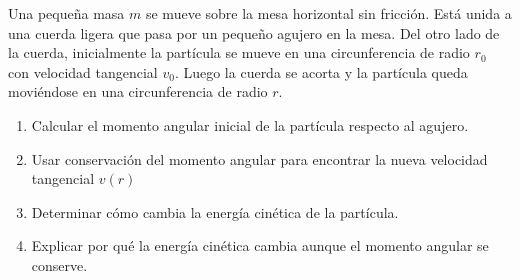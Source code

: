 \documentclass[12pt,a4paper]{article}
\begin{document}
    \begin{mdframed}[style=mdbluebox,frametitle={Ejercicio 2}]
        Una pequeña masa $m$ se mueve sobre la mesa horizontal sin fricción. Está unida a
        una cuerda ligera que pasa por un pequeño agujero en la mesa. Del otro lado de la cuerda,
        inicialmente la partícula se mueve en una circunferencia de radio $r_{0}$ con velocidad
        tangencial $v_{0}$. Luego la cuerda se acorta y la partícula queda moviéndose en una
        circunferencia de radio $r$.
        \begin{enumerate}
            \item[(a)] Calcular el momento angular inicial de la partícula respecto al agujero.
            \item[(b)] Usar conservación del momento angular para encontrar la nueva velocidad tangencial $v(r)$
            \item[(c)] Determinar cómo cambia la energía cinética de la partícula.
            \item[(d)] Explicar por qué la energía cinética cambia aunque el momento angular se conserve.   
        \end{enumerate}
    \end{mdframed}
\end{document}
